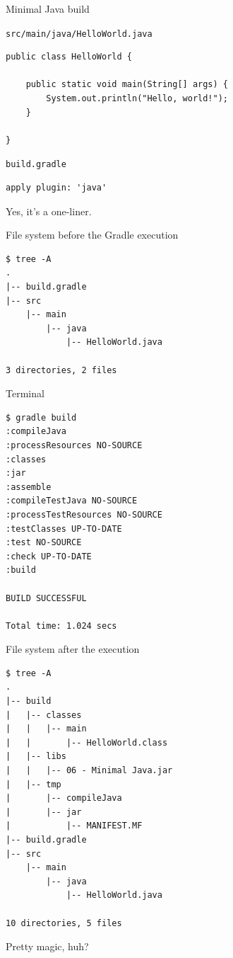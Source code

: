 \documentclass[presentation]{beamer}
\begin{document}
\begin{frame}{Minimal Java build}
	\begin{block}{\texttt{src/main/java/HelloWorld.java}}
		\begin{verbatim}
public class HelloWorld {

    public static void main(String[] args) {
        System.out.println("Hello, world!");
    }
    
}
		\end{verbatim}
	\end{block}
	\begin{block}{\texttt{build.gradle}}
		\begin{verbatim}
apply plugin: 'java'
		\end{verbatim}
	\end{block}
	Yes, it's a one-liner.
	\begin{block}{File system before the Gradle execution}
		\begin{verbatim}
$ tree -A
.
|-- build.gradle
|-- src
    |-- main
        |-- java
            |-- HelloWorld.java

3 directories, 2 files
		\end{verbatim}
	\end{block}
	\begin{block}{Terminal}
		\begin{verbatim}
$ gradle build
:compileJava
:processResources NO-SOURCE
:classes
:jar
:assemble
:compileTestJava NO-SOURCE
:processTestResources NO-SOURCE
:testClasses UP-TO-DATE
:test NO-SOURCE
:check UP-TO-DATE
:build

BUILD SUCCESSFUL

Total time: 1.024 secs
		\end{verbatim}
	\end{block}
	\begin{block}{File system after the execution}
		\begin{verbatim}
$ tree -A
.
|-- build
|   |-- classes
|   |   |-- main
|   |       |-- HelloWorld.class
|   |-- libs
|   |   |-- 06 - Minimal Java.jar
|   |-- tmp
|       |-- compileJava
|       |-- jar
|           |-- MANIFEST.MF
|-- build.gradle
|-- src
    |-- main
        |-- java
            |-- HelloWorld.java

10 directories, 5 files
		\end{verbatim}
	\end{block}
	\begin{center}
		Pretty magic, huh?
	\end{center}
\end{frame}
\end{document}

